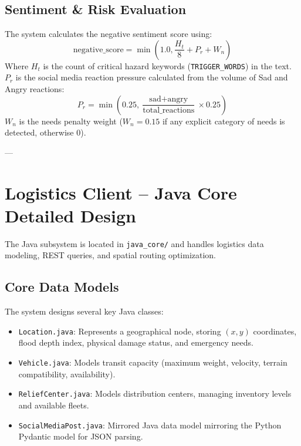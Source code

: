 \documentclass[12pt,a4paper]{article}
\begin{document}
\subsection{Sentiment \& Risk Evaluation}
The system calculates the negative sentiment score using:
\begin{equation}
\text{negative\_score} = \min\left(1.0, \frac{H_t}{8} + P_r + W_n\right)
\end{equation}
Where $H_t$ is the count of critical hazard keywords (\texttt{TRIGGER\_WORDS}) in the text. $P_r$ is the social media reaction pressure calculated from the volume of Sad and Angry reactions:
\begin{equation}
P_r = \min\left(0.25, \frac{\text{sad} + \text{angry}}{\text{total\_reactions}} \times 0.25\right)
\end{equation}
$W_n$ is the needs penalty weight ($W_n = 0.15$ if any explicit category of needs is detected, otherwise $0$).

---

\section{Logistics Client -- Java Core Detailed Design}

The Java subsystem is located in \texttt{java\_core/} and handles logistics data modeling, REST queries, and spatial routing optimization.

\subsection{Core Data Models}
The system designs several key Java classes:
\begin{itemize}
    \item \texttt{Location.java}: Represents a geographical node, storing $(x, y)$ coordinates, flood depth index, physical damage status, and emergency needs.
    \item \texttt{Vehicle.java}: Models transit capacity (maximum weight, velocity, terrain compatibility, availability).
    \item \texttt{ReliefCenter.java}: Models distribution centers, managing inventory levels and available fleets.
    \item \texttt{SocialMediaPost.java}: Mirrored Java data model mirroring the Python Pydantic model for JSON parsing.
\end{itemize}
\end{document}
